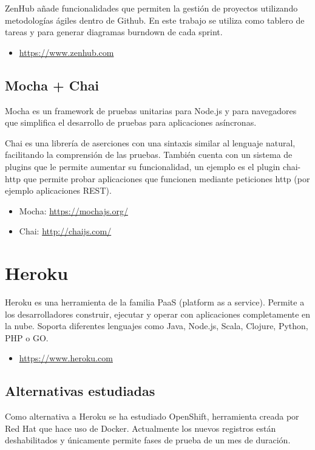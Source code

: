 ZenHub añade funcionalidades que permiten la gestión de proyectos utilizando metodologías ágiles dentro de Github. En este trabajo se utiliza como tablero de tareas y para generar diagramas burndown de cada sprint.

\begin{itemize}
	\item \url{https://www.zenhub.com}
\end{itemize}

\subsection{Mocha + Chai}

Mocha es un framework de pruebas unitarias para Node.js y para navegadores que simplifica el desarrollo de pruebas para aplicaciones asíncronas.

Chai es una librería de aserciones con una sintaxis similar al lenguaje natural, facilitando la comprensión de las pruebas. También cuenta con un sistema de plugins que le permite aumentar su funcionalidad, un ejemplo es el plugin chai-http que permite probar aplicaciones que funcionen mediante peticiones http (por ejemplo aplicaciones REST).

\begin{itemize}
	\item Mocha: \url{https://mochajs.org/}
	\item Chai: \url{http://chaijs.com/}
\end{itemize}

\section{Heroku}

Heroku es una herramienta de la familia PaaS (platform as a service). Permite a los desarrolladores construir, ejecutar y operar con aplicaciones completamente en la nube. Soporta diferentes lenguajes como Java, Node.js, Scala, Clojure, Python, PHP o GO.

\begin{itemize}
	\item \url{https://www.heroku.com}
\end{itemize}

\subsection{Alternativas estudiadas}

Como alternativa a Heroku se ha estudiado OpenShift, herramienta creada por Red Hat que hace uso de Docker. Actualmente los nuevos registros están deshabilitados y únicamente permite fases de prueba de un mes de duración.

